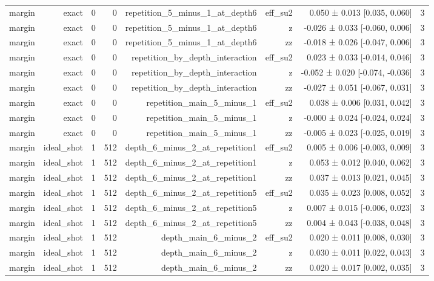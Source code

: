 \begin{table}
\begin{tabular}{lrrrrrrr}
margin & exact & 0 & 0 & repetition\_5\_minus\_1\_at\_depth6 & eff\_su2 & 0.050 ± 0.013 [0.035, 0.060] & 3 \\
margin & exact & 0 & 0 & repetition\_5\_minus\_1\_at\_depth6 & z & -0.026 ± 0.033 [-0.060, 0.006] & 3 \\
margin & exact & 0 & 0 & repetition\_5\_minus\_1\_at\_depth6 & zz & -0.018 ± 0.026 [-0.047, 0.006] & 3 \\
margin & exact & 0 & 0 & repetition\_by\_depth\_interaction & eff\_su2 & 0.023 ± 0.033 [-0.014, 0.046] & 3 \\
margin & exact & 0 & 0 & repetition\_by\_depth\_interaction & z & -0.052 ± 0.020 [-0.074, -0.036] & 3 \\
margin & exact & 0 & 0 & repetition\_by\_depth\_interaction & zz & -0.027 ± 0.051 [-0.067, 0.031] & 3 \\
margin & exact & 0 & 0 & repetition\_main\_5\_minus\_1 & eff\_su2 & 0.038 ± 0.006 [0.031, 0.042] & 3 \\
margin & exact & 0 & 0 & repetition\_main\_5\_minus\_1 & z & -0.000 ± 0.024 [-0.024, 0.024] & 3 \\
margin & exact & 0 & 0 & repetition\_main\_5\_minus\_1 & zz & -0.005 ± 0.023 [-0.025, 0.019] & 3 \\
margin & ideal\_shot & 1 & 512 & depth\_6\_minus\_2\_at\_repetition1 & eff\_su2 & 0.005 ± 0.006 [-0.003, 0.009] & 3 \\
margin & ideal\_shot & 1 & 512 & depth\_6\_minus\_2\_at\_repetition1 & z & 0.053 ± 0.012 [0.040, 0.062] & 3 \\
margin & ideal\_shot & 1 & 512 & depth\_6\_minus\_2\_at\_repetition1 & zz & 0.037 ± 0.013 [0.021, 0.045] & 3 \\
margin & ideal\_shot & 1 & 512 & depth\_6\_minus\_2\_at\_repetition5 & eff\_su2 & 0.035 ± 0.023 [0.008, 0.052] & 3 \\
margin & ideal\_shot & 1 & 512 & depth\_6\_minus\_2\_at\_repetition5 & z & 0.007 ± 0.015 [-0.006, 0.023] & 3 \\
margin & ideal\_shot & 1 & 512 & depth\_6\_minus\_2\_at\_repetition5 & zz & 0.004 ± 0.043 [-0.038, 0.048] & 3 \\
margin & ideal\_shot & 1 & 512 & depth\_main\_6\_minus\_2 & eff\_su2 & 0.020 ± 0.011 [0.008, 0.030] & 3 \\
margin & ideal\_shot & 1 & 512 & depth\_main\_6\_minus\_2 & z & 0.030 ± 0.011 [0.022, 0.043] & 3 \\
margin & ideal\_shot & 1 & 512 & depth\_main\_6\_minus\_2 & zz & 0.020 ± 0.017 [0.002, 0.035] & 3 \\

\end{tabular}
\end{table}
